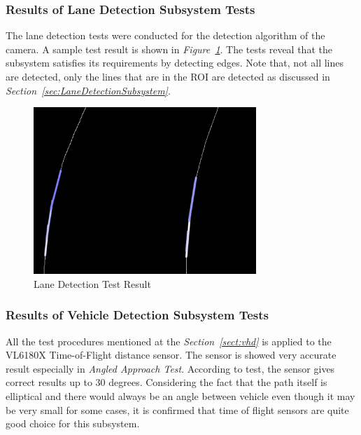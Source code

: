 \documentclass[a4paper,12pt]{article}
\begin{document}
\subsubsection*{Results of Lane Detection Subsystem Tests}


The lane detection tests were conducted for the detection algorithm of the camera. A sample test result is shown in \textit{Figure~\ref{fig:laneD_test}}. The tests reveal that the subsystem satisfies its requirements by detecting edges. Note that, not all lines are detected, only the lines that are in the ROI are detected as discussed in \textit{Section~\ref{sec:LaneDetectionSubsystem}}.


\begin{figure}[h]

\includegraphics[width=0.75\textwidth,center]{images/laneD_test}

\caption{Lane Detection Test Result \label{fig:laneD_test} }

\end{figure}




\subsubsection*{Results of Vehicle Detection Subsystem Tests}



All the test procedures mentioned at the \textit{Section~\ref{sect:vhd}} is applied to the VL6180X Time-of-Flight distance sensor. The sensor is showed very accurate result especially in \textit{Angled Approach Test}. According to test, the sensor gives correct results up to 30 degrees. Considering the fact that the path itself is elliptical and there would always be an angle between vehicle even though it may be very small for some cases, it is confirmed that time of flight sensors are quite good choice for this subsystem.
\end{document}
